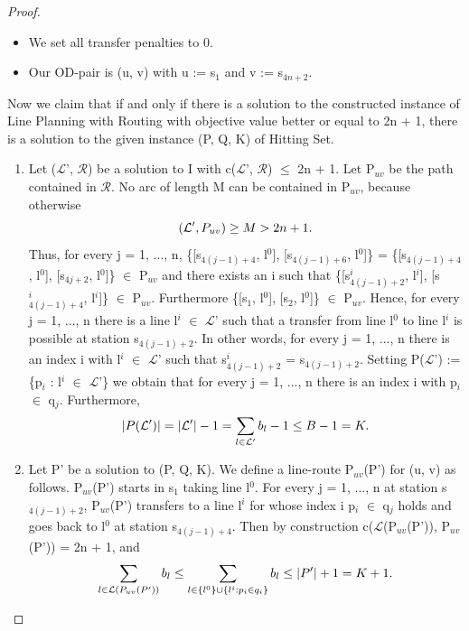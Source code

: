 \documentclass[
  twoside,
  11pt, a4paper,
  footinclude=true,
  headinclude=true,
  cleardoublepage=empty
]{scrbook}
\theoremstyle{definition}
\begin{document}
\begin{proof}
\begin{itemize}
\item We set all transfer penalties to 0.
\item Our OD-pair is (u, v) with u := s$_1$ and v := s$_{4n+2}$. 
\end{itemize}
Now we claim that if and only if there is a solution to the constructed instance of Line Planning with Routing with objective value better or equal to 2n + 1, there is a solution to the given instance (P, Q, K) of Hitting Set.
\begin{enumerate}
\item Let ($\mathcal{L}$', $\mathcal{R}$) be a solution to I with c($\mathcal{L}$', $\mathcal{R}$) $\le$ 2n + 1. Let P$_{uv}$ be the path contained in $\mathcal{R}$. No arc of length M can be contained in P$_{uv}$, because otherwise
\begin{equation} \notag
(\mathcal{L}', P_{uv}) \ge M > 2n + 1.
\end{equation}
Thus, for every j = 1, ..., n, \{[s$_{4(j-1)+4}$, l$^0$], [s$_{4(j-1)+6}$, l$^0$]\} = \{[s$_{4(j-1)+4}$, l$^0$], [s$_{4j+2}$, l$^0$]\} $\in$ P$_{uv}$ and there exists an i such that \{[s$^i_{4(j-1)+2}$, l$^i$], [s$^i_{4(j-1)+4}$, l$^i$]\} $\in$ P$_{uv}$. Furthermore \{[s$_1$, l$^0$], [s$_2$, l$^0$]\} $\in$ P$_{uv}$.
Hence, for every j = 1, ..., n there is a line l$^i$ $\in$ $\mathcal{L}$' such that a transfer from line l$^0$ to line l$^i$ is possible at station s$_{4(j-1)+2}$. In other words, for every j = 1, ..., n there is an index i with l$^i$ $\in$ $\mathcal{L}$' such that s$^i_{4(j-1)+2}$ = s$_{4(j-1)+2}$. \newline
Setting P($\mathcal{L}$') := \{p$_i$ : l$^i$ $\in$ $\mathcal{L}$'\} we obtain that for every j = 1, ..., n there is an index i with p$_i$ $\in$ q$_j$. Furthermore,
\begin{equation} \notag
|P(\mathcal{L}')| = |\mathcal{L}'| - 1 = \sum_{l \in \mathcal{L}'} b_l - 1 \le B - 1 = K.
\end{equation}
\item Let P' be a solution to (P, Q, K). We define a line-route P$_{uv}$(P') for (u, v) as follows. P$_{uv}$(P') starts in s$_1$ taking line l$^0$. For every j = 1, ..., n at station s$_{4(j-1)+2}$, P$_{uv}$(P') transfers to a line l$^i$ for whose index i p$_i$ $\in$ q$_j$ holds and goes back to l$^0$ at station s$_{4(j-1)+4}$. \newline
Then by construction c($\mathcal{L}$(P$_{uv}$(P')), P$_{uv}$(P')) = 2n + 1, and
\begin{equation} \notag
\sum_{l\in\mathcal{L}(P_{uv}(P'))} b_l \le \sum_{l\in\{l^0\}\cup\{l^i:p_i\in q_i\}} b_l \le |P'| + 1 = K + 1.
\end{equation}
\end{enumerate} 
\end{proof} 
\end{document}
